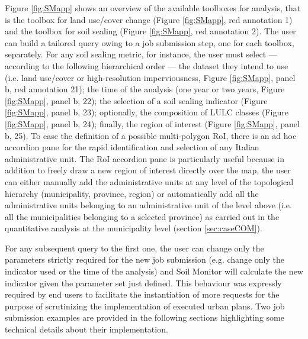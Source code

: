 \documentclass[APA,LATO1COL,doublespace]{WileyNJD-v2}
\begin{document}
Figure \ref{fig:SMapp} shows an overview of the available toolboxes for analysis, that is the toolbox for land use/cover change (Figure \ref{fig:SMapp}, red annotation 1) and the toolbox for soil sealing (Figure \ref{fig:SMapp}, red annotation 2).
The user can build a tailored query owing to a job submission step, one for each toolbox, separately. 
For any soil sealing metric, for instance, the user must select --- according to the following hierarchical order --- 
the dataset they intend to use (i.e. land use/cover or high-resolution imperviousness, Figure \ref{fig:SMapp}, panel b, red annotation 21); 
the time of the analysis (one year or two years, Figure \ref{fig:SMapp}, panel b, 22); 
the selection of a soil sealing indicator (Figure \ref{fig:SMapp}, panel b, 23); 
optionally, the composition of LULC classes (Figure \ref{fig:SMapp}, panel b, 24); 
finally, the region of interest (Figure \ref{fig:SMapp}, panel b, 25). 
To ease the definition of a possible multi-polygon RoI, there is an ad hoc accordion pane for the rapid identification and selection of any Italian administrative unit.
The RoI accordion pane is particularly useful because in addition to freely draw a new region of interest directly over the map, the user can either manually add the administrative units at any level of the topological hierarchy (municipality, province, region) 
or automatically add all the administrative units belonging to an administrative unit of the level above (i.e. all the municipalities belonging to a selected province) as carried out in the quantitative analysis at the municipality level (section \ref{sec:caseCOM}).

For any subsequent query to the first one, the user can change only the parameters strictly required for the new job submission (e.g. change only the indicator used or the time of the analysis) and Soil Monitor will calculate the new indicator given the parameter set just defined. 
This behaviour was expressly required by end users to facilitate the instantiation of more requests for the purpose of scrutinizing the implementation of executed urban plans.
Two job submission examples are provided in the following sections highlighting some technical details about their implementation.
\end{document}
